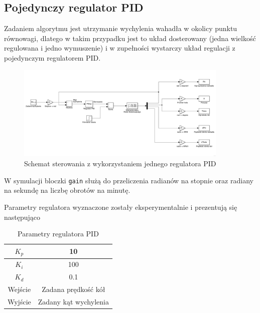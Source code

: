 \subsection{Pojedynczy regulator PID}
Zadaniem algorytmu jest utrzymanie wychylenia wahadła w okolicy punktu równowagi, dlatego w takim przypadku jest to układ dosterowany (jedna wielkość regulowana i jedno wymuszenie) i w zupełności wystarczy układ regulacji z pojedynczym regulatorem PID.
\begin{figure}[h!]
    \centering
	\includegraphics[width=0.9\textwidth]{Rysunki/Rozdzial02/Pojedynczy_PID.png}
	\caption{Schemat sterowania z wykorzystaniem jednego regulatora PID}
\end{figure}

W symulacji bloczki \texttt{gain} służą do przeliczenia radianów na stopnie oraz radiany na sekundę na liczbę obrotów na minutę.

Parametry regulatora wyznaczone zostały eksperymentalnie i prezentują się następująco
\begin{table}[h!]
    \centering
    \begin{tabular}{|c|c|}
        \hline
        $K_p$ & 10 \\
        \hline
        $K_i$ & 100 \\
        \hline
        $K_d$ & 0.1 \\
        \hline
        Wejście & Zadana prędkość kół \\
        \hline
        Wyjście & Zadany kąt wychylenia \\
        \hline
    \end{tabular}
        
    \caption{Parametry regulatora PID}
    \label{Parametry PID}
\end{table}

